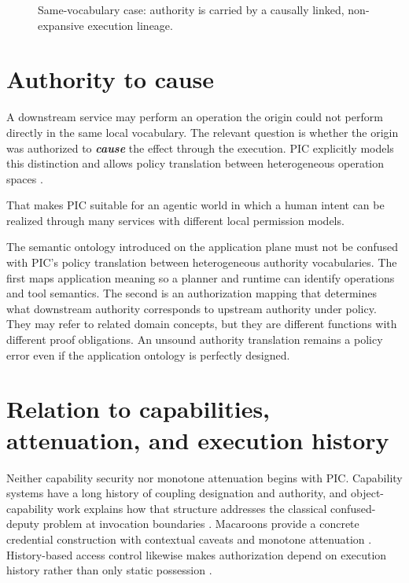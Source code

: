 \documentclass[10pt,oneside,openany]{book}
\begin{document}
\begin{figure}[ht]
\centering
{}
\caption{Same-vocabulary case: authority is carried by a causally linked, non-expansive execution lineage.}
\end{figure}

\section{Authority to cause}
A downstream service may perform an operation the origin could not perform directly in the same local vocabulary. The relevant question is whether the origin was authorized to \textbf{\emph{cause}} the effect through the execution. PIC explicitly models this distinction and allows policy translation between heterogeneous operation spaces \cite{gallo2026pic}.

That makes PIC suitable for an agentic world in which a human intent can be realized through many services with different local permission models.

The semantic ontology introduced on the application plane must not be confused with PIC's policy translation between heterogeneous authority vocabularies. The first maps application meaning so a planner and runtime can identify operations and tool semantics. The second is an authorization mapping that determines what downstream authority corresponds to upstream authority under policy. They may refer to related domain concepts, but they are different functions with different proof obligations. An unsound authority translation remains a policy error even if the application ontology is perfectly designed.

\section{Relation to capabilities, attenuation, and execution history}
Neither capability security nor monotone attenuation begins with PIC. Capability systems have a long history of coupling designation and authority, and object-capability work explains how that structure addresses the classical confused-deputy problem at invocation boundaries \cite{dennis1966,miller2003,hardy1988}. Macaroons provide a concrete credential construction with contextual caveats and monotone attenuation \cite{birgisson2014}. History-based access control likewise makes authorization depend on execution history rather than only static possession \cite{abadi2003}.
\end{document}
